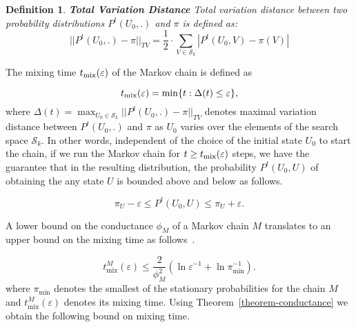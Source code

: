 \documentclass{sig-alternate-2013}
\newtheorem{definition}[theorem]{Definition}
\begin{document}
\begin{definition}{\bf{Total Variation Distance}\cite{david}}
  Total variation distance between two probability distributions
  $P^t(U_0,.)$ and $\pi$ is defined as:
  \[
  ||P^t(U_0,.)-\pi||_{TV} = \frac{1}{2} \cdot \sum_{V \in
    \mathcal{S}_k}|P^t(U_0,V)- \pi(V)|
  \]
\end{definition} 

The mixing time $t_{\mathrm{mix}}(\varepsilon)$ of the Markov chain is defined as

\begin{displaymath}
  t_{\mathrm{mix}}(\varepsilon) = \min\{t: \Delta(t)  \leq \varepsilon\},
\end{displaymath}
where $\Delta(t)= \max_{U_0 \in \mathcal{S}_k}||P^t(U_0,.)-\pi||_{TV}$
denotes maximal variation distance between $P^t(U_0,.)$ and $\pi$ as
$U_0$ varies over the elements of the search space
$\mathcal{S}_k$\cite{david}. In other words, independent of the choice
of the initial state $U_0$ to start the chain, if we run the Markov
chain for $t \geq t_{\mathrm{mix}}(\varepsilon)$ steps, we have the guarantee that in the
resulting distribution, the probability $P^t(U_0,U)$ of obtaining the
any state $U$ is bounded above and below as follows.

\[  \pi_U - \varepsilon \leq P^t(U_0,U) \leq \pi_U + \varepsilon. \]

A lower bound on the conductance $\phi_M$ of a Markov chain $M$
translates to an upper bound on the mixing time as
follows~\cite[Equation (2.13), page 58]{alistair}.

\begin{equation}
  t_{\mathrm{mix}}^M(\varepsilon) 
  \leq \frac{2}{\phi_M^{2}} 
  \left( \ln{\varepsilon^{-1}} + 
    \ln{\pi_{\min}^{-1}} \right).
  \label{eqn-mixing-time}
\end{equation}
where $\pi_{\min}$ denotes the smallest of the stationary
probabilities for the chain $M$ and $t_{\mathrm{mix}}^M(\varepsilon)$
denotes its mixing time. Using Theorem~\ref{theorem-conductance} we
obtain the following bound on mixing time.
\end{document}
